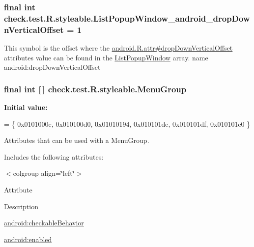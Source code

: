 \subsubsection[{List\+Popup\+Window\+\_\+android\+\_\+drop\+Down\+Vertical\+Offset}]{\setlength{\rightskip}{0pt plus 5cm}final int check.\+test.\+R.\+styleable.\+List\+Popup\+Window\+\_\+android\+\_\+drop\+Down\+Vertical\+Offset = 1\hspace{0.3cm}{\ttfamily [static]}}\label{classcheck_1_1test_1_1_r_1_1styleable_acecd6539df16569ba9082b78ed8d0e60}
This symbol is the offset where the \hyperlink{}{android.\+R.\+attr\#drop\+Down\+Vertical\+Offset} attribute\textquotesingle{}s value can be found in the \hyperlink{classcheck_1_1test_1_1_r_1_1styleable_a1d50d8182170e4c2bdda14aea31bd244}{List\+Popup\+Window} array.  name android\+:drop\+Down\+Vertical\+Offset \hypertarget{classcheck_1_1test_1_1_r_1_1styleable_a95a67e0fb4cd8754aea3728538c936cf}{}
\subsubsection[{Menu\+Group}]{\setlength{\rightskip}{0pt plus 5cm}final int \mbox{[}$\,$\mbox{]} check.\+test.\+R.\+styleable.\+Menu\+Group\hspace{0.3cm}{\ttfamily [static]}}\label{classcheck_1_1test_1_1_r_1_1styleable_a95a67e0fb4cd8754aea3728538c936cf}
{\bfseries Initial value\+:}
\begin{DoxyCode}
= \{
            0x0101000e, 0x010100d0, 0x01010194, 0x010101de,
            0x010101df, 0x010101e0
        \}
\end{DoxyCode}
Attributes that can be used with a Menu\+Group. 

Includes the following attributes\+:

\begin{TabularC}{0}
\hline
\end{TabularC}
$<$colgroup align=\char`\"{}left\char`\"{}$>$ 

Attribute

Description 

{\ttfamily \hyperlink{classcheck_1_1test_1_1_r_1_1styleable_ad0fe31daacd1ba191fff33b4f294c242}{android\+:checkable\+Behavior}}

{\ttfamily \hyperlink{classcheck_1_1test_1_1_r_1_1styleable_a4181140c18864b52c09f5f001c0f9cba}{android\+:enabled}}

